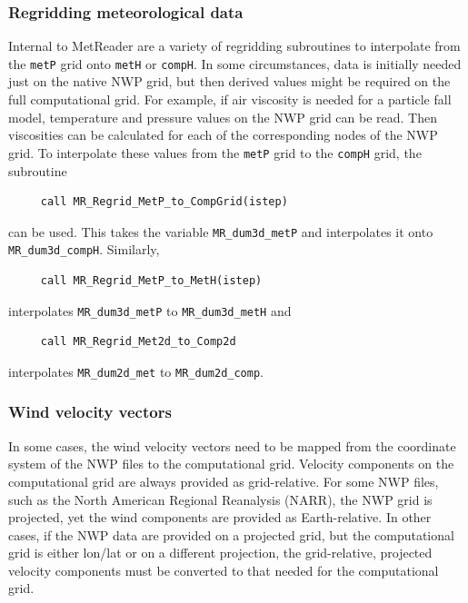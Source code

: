 \documentclass[11pt]{article}   %
\begin{document}
\subsubsection{Regridding meteorological data}
Internal to MetReader are a variety of regridding subroutines to interpolate from
the \texttt{metP} grid onto \texttt{metH} or \texttt{compH}.  
In some circumstances, data is initially needed just on the native NWP grid, but
then derived values might be required on the full computational grid.
For example, if air viscosity is needed for a particle fall model, temperature and
pressure values on the NWP grid can be read.  Then viscosities can be calculated for each
of the corresponding nodes of the NWP grid.  To interpolate these values from the 
\texttt{metP} grid to the \texttt{compH} grid, the subroutine
\begin{verbatim}
     call MR_Regrid_MetP_to_CompGrid(istep)
\end{verbatim}
can be used.  This takes the variable \texttt{MR\_dum3d\_metP} and interpolates it
onto \texttt{MR\_dum3d\_compH}.  Similarly, 
\begin{verbatim}
     call MR_Regrid_MetP_to_MetH(istep)
\end{verbatim}
interpolates \texttt{MR\_dum3d\_metP} to \texttt{MR\_dum3d\_metH} and 
\begin{verbatim}
     call MR_Regrid_Met2d_to_Comp2d
\end{verbatim}
interpolates \texttt{MR\_dum2d\_met} to \texttt{MR\_dum2d\_comp}.


\subsubsection{Wind velocity vectors}
In some cases, the wind velocity vectors need to be mapped from the coordinate
system of the NWP files to the computational grid.  Velocity components on the
computational grid are always provided as grid-relative.  For some NWP files, such
as the North American Regional Reanalysis (NARR), the NWP grid is projected, yet
the wind components are provided as Earth-relative.  In other cases, if the NWP
data are provided on a projected grid, but the computational grid is either lon/lat
or on a different projection, the grid-relative, projected velocity components must
be converted to that needed for the computational grid.
\end{document}
